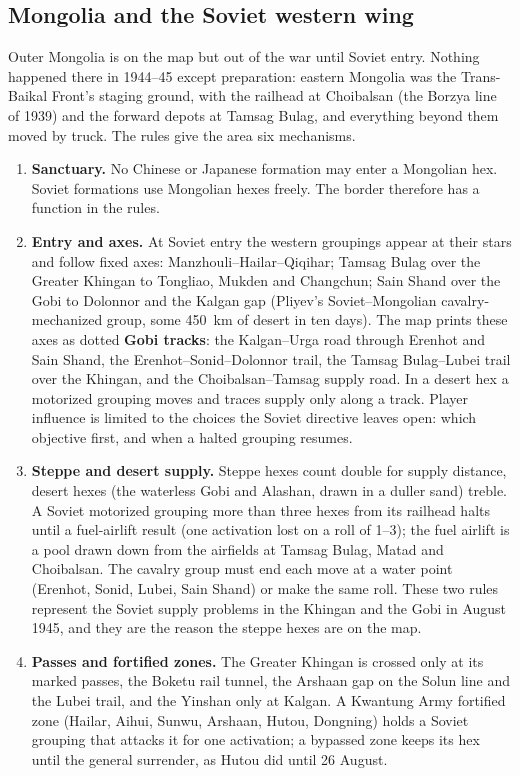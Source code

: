 \documentclass[11pt]{article}
\begin{document}
\subsection{Mongolia and the Soviet western wing}
Outer Mongolia is on the map but out of the war until Soviet entry. Nothing happened there in 1944--45 except preparation: eastern Mongolia was the Trans-Baikal Front's staging ground, with the railhead at Choibalsan (the Borzya line of 1939) and the forward depots at Tamsag Bulag, and everything beyond them moved by truck. The rules give the area six mechanisms.
\begin{enumerate}
\item \textbf{Sanctuary.} No Chinese or Japanese formation may enter a Mongolian hex. Soviet formations use Mongolian hexes freely. The border therefore has a function in the rules.
\item \textbf{Entry and axes.} At Soviet entry the western groupings appear at their stars and follow fixed axes: Manzhouli--Hailar--Qiqihar; Tamsag Bulag over the Greater Khingan to Tongliao, Mukden and Changchun; Sain Shand over the Gobi to Dolonnor and the Kalgan gap (Pliyev's Soviet--Mongolian cavalry-mechanized group, some 450~km of desert in ten days). The map prints these axes as dotted \textbf{Gobi tracks}: the Kalgan--Urga road through Erenhot and Sain Shand, the Erenhot--Sonid--Dolonnor trail, the Tamsag Bulag--Lubei trail over the Khingan, and the Choibalsan--Tamsag supply road. In a desert hex a motorized grouping moves and traces supply only along a track. Player influence is limited to the choices the Soviet directive leaves open: which objective first, and when a halted grouping resumes.
\item \textbf{Steppe and desert supply.} Steppe hexes count double for supply distance, desert hexes (the waterless Gobi and Alashan, drawn in a duller sand) treble. A Soviet motorized grouping more than three hexes from its railhead halts until a fuel-airlift result (one activation lost on a roll of 1--3); the fuel airlift is a pool drawn down from the airfields at Tamsag Bulag, Matad and Choibalsan. The cavalry group must end each move at a water point (Erenhot, Sonid, Lubei, Sain Shand) or make the same roll. These two rules represent the Soviet supply problems in the Khingan and the Gobi in August 1945, and they are the reason the steppe hexes are on the map.
\item \textbf{Passes and fortified zones.} The Greater Khingan is crossed only at its marked passes, the Boketu rail tunnel, the Arshaan gap on the Solun line and the Lubei trail, and the Yinshan only at Kalgan. A Kwantung Army fortified zone (Hailar, Aihui, Sunwu, Arshaan, Hutou, Dongning) holds a Soviet grouping that attacks it for one activation; a bypassed zone keeps its hex until the general surrender, as Hutou did until 26 August.

\end{enumerate}
\end{document}
